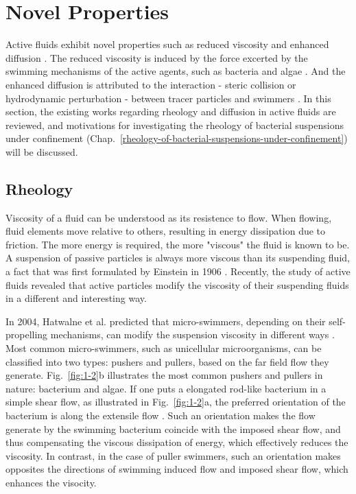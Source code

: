 \section{Novel Properties}
\label{emergent-properties}
Active fluids exhibit novel properties such as reduced viscosity and enhanced diffusion  \cite{Ramaswamy2010}. The reduced viscosity is induced by the force excerted by the swimming mechanisms of the active agents, such as bacteria and algae \cite{Saintillan2018}. And the enhanced diffusion is attributed to the interaction - steric collision or hydrodynamic perturbation - between tracer particles and swimmers
\cite{Wu2000, Peng2016, Caspi2000, Morozov2014, Patteson2016, Leptos2009,
 Yang2016, Valeriani2011, Kurtuldu2011}.
In this section, the existing works regarding rheology and diffusion in active fluids are reviewed, and motivations for investigating the rheology of bacterial suspensions under confinement (Chap.~\ref{rheology-of-bacterial-suspensions-under-confinement}) will be discussed.


\subsection{Rheology}
\label{sec:rheology}
Viscosity of a fluid can be understood as its resistence to flow. When flowing, fluid elements move relative to others, resulting in energy dissipation due to friction. The more energy is required, the more "viscous" the fluid is known to be. A suspension
of passive particles is always more viscous than its suspending fluid, a fact that was first formulated by Einstein in 1906 \cite{Einstein1906}. Recently, the study of active fluids revealed that active particles modify the viscosity of their suspending fluids in a different and interesting way.

In 2004, Hatwalne et al. predicted that micro-swimmers, depending on their self-propelling mechanisms, can modify the suspension viscosity in different ways \cite{Hatwalne2004}. Most common micro-swimmers, such as unicellular microorganisms, can be classified into two types: pushers and pullers, based on the far field flow they generate. Fig.~\ref{fig:1-2}b illustrates the most common pushers and pullers in nature: bacterium and algae. If one puts a elongated rod-like bacterium in a simple shear flow, as illustrated in Fig.~\ref{fig:1-2}a, the preferred orientation of the bacterium is along the extensile flow \cite{Forster1974}. Such an orientation makes the flow generate by the swimming bacterium coincide with the imposed shear flow, and thus compensating the viscous dissipation of energy, which effectively reduces the viscosity. In contrast, in the case of puller swimmers, such an orientation makes opposites the directions of swimming induced flow and imposed shear flow, which enhances the visocity.

